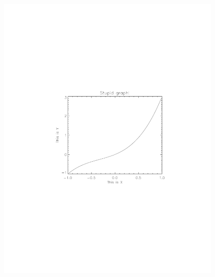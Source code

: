 \documentclass[12pt,preprint]{aastex}
\begin{document}
\begin{itemize}
\begin{figure}[b!]
\begin{center} \leavevmode
\includegraphics[scale=.55]{simple.pdf}

\end{center}
\end{figure}
\end{itemize}
\end{document}

